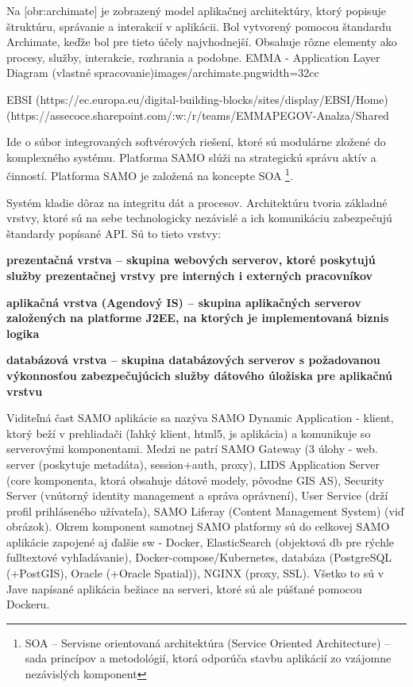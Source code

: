 Na [obr:archimate] je zobrazený model aplikačnej architektúry, ktorý popisuje štruktúru, správanie a interakcií v aplikácii. Bol vytvorený pomocou štandardu Archimate, keďže bol pre tieto účely najvhodnejší. Obsahuje rôzne elementy ako procesy, služby, interakcie, rozhrania a podobne.
{EMMA - Application Layer Diagram (vlastné spracovanie)}{images/archimate.png}{width=32cc}

\TODO EBSI (https://ec.europa.eu/digital-building-blocks/sites/display/EBSI/Home) (https://assecoce.sharepoint.com/:w:/r/teams/EMMAPEGOV-Analza/Shared%

Ide o súbor integrovaných softvérových riešení, ktoré sú modulárne zložené do komplexného systému. Platforma SAMO slúži na strategickú správu aktív a činností. Platforma SAMO je založená na koncepte SOA \footnote{SOA -- Servisne orientovaná architektúra (Service Oriented Architecture) -- sada princípov a metodológií, ktorá odporúča stavbu aplikácií zo vzájomne nezávislých komponent}. %


Systém kladie dôraz na integritu dát a procesov. Architektúru tvoria základné vrstvy, ktoré sú na sebe technologicky nezávislé a ich komunikáciu zabezpečujú štandardy popísané API. Sú to tieto vrstvy:

\startitemize
\item \start\bf prezentačná vrstva \stop -- skupina webových serverov, ktoré poskytujú služby prezentačnej vrstvy pre interných i externých pracovníkov
\item \start\bf aplikačná vrstva \stop (Agendový IS) -- skupina aplikačných serverov založených na platforme J2EE, na ktorých je implementovaná biznis logika
\item  \start\bf databázová vrstva \stop -- skupina databázových serverov s požadovanou výkonnosťou zabezpečujúcich služby dátového úložiska pre aplikačnú vrstvu
\stopitemize

Viditeľná čast SAMO aplikácie sa nazýva SAMO Dynamic Application - klient, ktorý beží v prehliadači (ľahký klient, html5, js aplikácia) a komunikuje so serverovými komponentami. Medzi ne patrí SAMO Gateway (3 úlohy - web. server (poskytuje metadáta), session+auth, proxy), LIDS Application Server (core komponenta, ktorá obsahuje dátové modely, pôvodne GIS AS), Security Server (vnútorný identity management a správa oprávnení), User Service (drží profil prihláseného užívateľa), SAMO Liferay (Content Management System) (viď obrázok). Okrem komponent samotnej SAMO platformy sú do celkovej SAMO aplikácie zapojené aj ďalšie sw - Docker, ElasticSearch (objektová db pre rýchle fulltextové vyhľadávanie), Docker-compose/Kubernetes, databáza (PostgreSQL (+PostGIS), Oracle (+Oracle Spatial)), NGINX (proxy, SSL). Všetko to sú v Jave napísané aplikácia bežiace na serveri, ktoré sú ale púšťané pomocou Dockeru.

